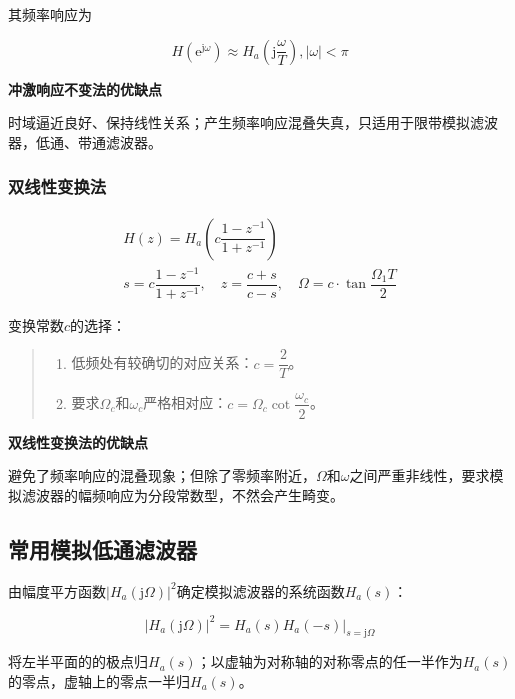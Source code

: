 \documentclass[cn, hazy, blue, normal, 12pt]{elegantnote}
\begin{document}
其频率响应为

\begin{equation}
    H(\text{e}^{\text{j}\omega})\approx H_a\left(\text{j}\frac{\omega}{T}\right), |\omega|<\pi
\end{equation}

\textbf{冲激响应不变法的优缺点}

时域逼近良好、保持线性关系；产生频率响应混叠失真，只适用于限带模拟滤波器，低通、带通滤波器。

\subsubsection{双线性变换法}

\begin{equation}
    \begin{array}{cc}
    H(z)=H_a\left(c\dfrac{1-z^{-1}}{1+z^{-1}}\right)\\
    s=c\dfrac{1-z^{-1}}{1+z^{-1}}, \quad z=\dfrac{c+s}{c-s}, \quad \Omega=c\cdot\tan\dfrac{\Omega_1 T}{2}
    \end{array}
\end{equation}

变换常数$c$的选择：

\begin{quote}
\begin{enumerate}
    \item 低频处有较确切的对应关系：$c=\dfrac{2}{T}$。
    \item 要求$\Omega_c$和$\omega_c$严格相对应：$c=\Omega_c\cot\dfrac{\omega_c}{2}$。
\end{enumerate}
\end{quote}

\textbf{双线性变换法的优缺点}

避免了频率响应的混叠现象；但除了零频率附近，$\Omega$和$\omega$之间严重非线性，要求模拟滤波器的幅频响应为分段常数型，不然会产生畸变。

\subsection{常用模拟低通滤波器}

由幅度平方函数$|H_a(\text{j}\Omega)|^2$确定模拟滤波器的系统函数$H_a(s)$：

\begin{equation}
    |H_a(\text{j}\Omega)|^2=H_a(s)H_a(-s)|_{s=\text{j}\Omega}
\end{equation}

将左半平面的的极点归$H_a(s)$；以虚轴为对称轴的对称零点的任一半作为$H_a(s)$的零点，虚轴上的零点一半归$H_a(s)$。
\end{document}
